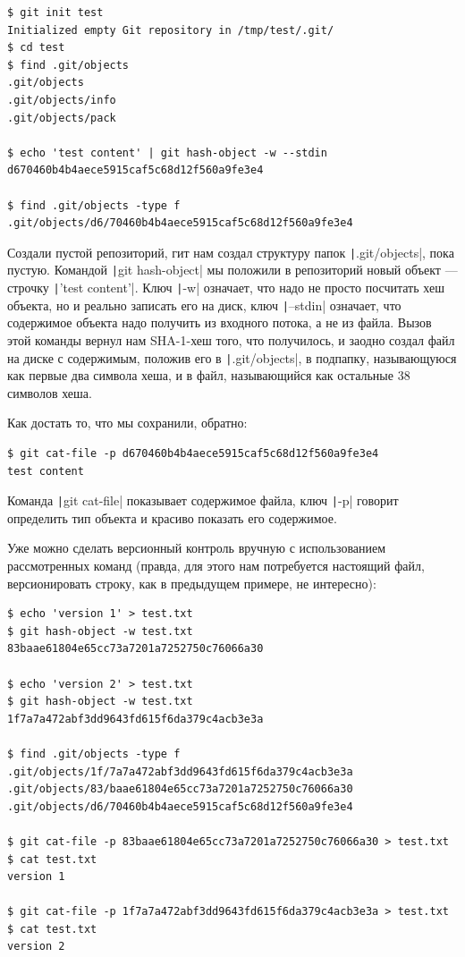 \documentclass[a5paper]{article}
\begin{document}
\begin{verbatim}
$ git init test
Initialized empty Git repository in /tmp/test/.git/
$ cd test
$ find .git/objects
.git/objects
.git/objects/info
.git/objects/pack

$ echo 'test content' | git hash-object -w --stdin
d670460b4b4aece5915caf5c68d12f560a9fe3e4

$ find .git/objects -type f
.git/objects/d6/70460b4b4aece5915caf5c68d12f560a9fe3e4
\end{verbatim}

Создали пустой репозиторий, гит нам создал структуру папок \texttt|.git/objects|, пока пустую. Командой \texttt|git hash-object| мы положили в репозиторий новый объект --- строчку \texttt|'test content'|. Ключ \texttt|-w| означает, что надо не просто посчитать хеш объекта, но и реально записать его на диск, ключ \texttt|--stdin| означает, что содержимое объекта надо получить из входного потока, а не из файла. Вызов этой команды вернул нам SHA-1-хеш того, что получилось, и заодно создал файл на диске с содержимым, положив его в \texttt|.git/objects|, в подпапку, называющуюся как первые два символа хеша, и в файл, называющийся как остальные 38 символов хеша.

Как достать то, что мы сохранили, обратно:
\begin{verbatim}
$ git cat-file -p d670460b4b4aece5915caf5c68d12f560a9fe3e4
test content
\end{verbatim}

Команда \texttt|git cat-file| показывает содержимое файла, ключ \texttt|-p| говорит определить тип объекта и красиво показать его содержимое.

Уже можно сделать версионный контроль вручную с использованием рассмотренных команд (правда, для этого нам потребуется настоящий файл, версионировать строку, как в предыдущем примере, не интересно):

\begin{verbatim}
$ echo 'version 1' > test.txt
$ git hash-object -w test.txt
83baae61804e65cc73a7201a7252750c76066a30

$ echo 'version 2' > test.txt
$ git hash-object -w test.txt
1f7a7a472abf3dd9643fd615f6da379c4acb3e3a

$ find .git/objects -type f
.git/objects/1f/7a7a472abf3dd9643fd615f6da379c4acb3e3a
.git/objects/83/baae61804e65cc73a7201a7252750c76066a30
.git/objects/d6/70460b4b4aece5915caf5c68d12f560a9fe3e4

$ git cat-file -p 83baae61804e65cc73a7201a7252750c76066a30 > test.txt
$ cat test.txt
version 1

$ git cat-file -p 1f7a7a472abf3dd9643fd615f6da379c4acb3e3a > test.txt
$ cat test.txt
version 2
\end{verbatim}
\end{document}

